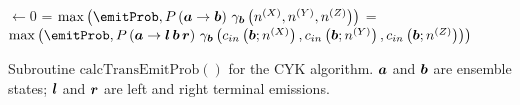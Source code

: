 \documentclass[10pt]{article}
\begin{document}
\begin{algorithm}[!ht]
  \SetLine

  \emitProb $\leftarrow 0$\;
   {
    \emitProb = $\max \left( \emitProb, P \left( \bvec{a} \to \bvec{b} \right)\, \gamma_{\bvec{b}}\left( n^{(X)}, n^{(Y)}, n^{(Z)} \right) \right)$\;
  }
   {
    \emitProb = $\max \left( \emitProb, P \left( \bvec{a} \to \bvec{l}\,\bvec{b}\,\bvec{r} \right)\, \gamma_{\bvec{b}}\left( c_{in}\left(\bvec{b}; n^{(X)}\right), c_{in}\left(\bvec{b}; n^{(Y)}\right), c_{in}\left(\bvec{b}; n^{(Z)}\right) \right) \right)$\;
  }
  \KwRet{\emitProb}\;
  \caption{
    Subroutine $\mathrm{calcTransEmitProb}()$ for the CYK algorithm.
    $\boldsymbol{a}$ and $\boldsymbol{b}$ are ensemble states; $\boldsymbol{l}$ and $\boldsymbol{r}$ are left and right terminal emissions.
  }
\end{algorithm}
\end{document}
